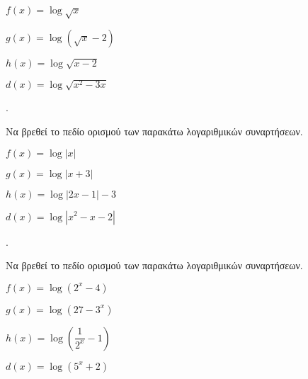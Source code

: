 \documentclass[11pt,a4paper,twocolumn]{article}
\newcounter{askhsh}
\newcommand{\askhsh}{\large\theaskhsh.\ \addtocounter{askhsh}{1}}
\begin{document}
\begin{alist}
\item $ f(x)=\log{\sqrt{x}} $
\item $ g(x)=\log{\left( \sqrt{x}-2\right) } $
\item $ h(x)=\log{\sqrt{x-2}} $
\item $ d(x)=\log{\sqrt{x^2-3x} } $
\end{alist}
\askhsh Να βρεθεί το πεδίο ορισμού των παρακάτω λογαριθμικών συναρτήσεων.
\begin{alist}
\item $ f(x)=\log{|x|} $
\item $ g(x)=\log{|x+3| } $
\item $ h(x)=\log{|2x-1|-3} $
\item $ d(x)=\log{\left| x^2-x-2\right|  } $
\end{alist}
\askhsh Να βρεθεί το πεδίο ορισμού των παρακάτω λογαριθμικών συναρτήσεων.
\begin{alist}
\item $ f(x)=\log{\left(2^x-4\right)} $
\item $ g(x)=\log{\left(27-3^x\right)} $
\item $ h(x)=\log{\left(\dfrac{1}{2^x}-1\right)} $
\item $ d(x)=\log{\left(5^x+2\right)} $
\end{alist}
\end{document}
